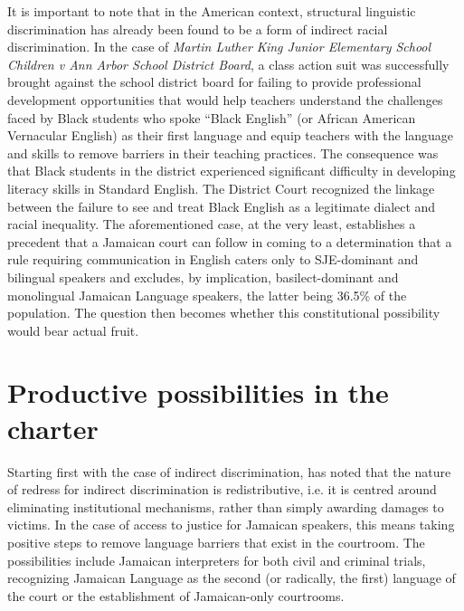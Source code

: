 \documentclass[output=paper,colorlinks,citecolor=brown]{langscibook}
\begin{document}
It is important to note that in the American context, structural linguistic discrimination has already been found to be a form of indirect racial discrimination. In the case of \textit{Martin Luther King Junior Elementary School Children v Ann Arbor School District Board}, a class action suit was successfully brought against the school district board for failing to provide professional development opportunities that would help teachers understand the challenges faced by Black students who spoke “Black English” (or African American Vernacular English) as their first language and equip teachers with the language and skills to remove barriers in their teaching practices. The consequence was that Black students in the district experienced significant difficulty in developing literacy skills in Standard English. The District Court recognized the linkage between the failure to see and treat Black English as a legitimate dialect and racial inequality. The aforementioned case, at the very least, establishes a precedent that a Jamaican court can follow in coming to a determination that a rule requiring communication in English caters only to SJE-dominant and bilingual speakers and excludes, by implication, basilect-dominant and monolingual Jamaican Language speakers, the latter being 36.5\% of the population. The question then becomes whether this constitutional possibility would bear actual fruit. 


\section{Productive possibilities in the charter}
 
Starting first with the case of indirect discrimination, \citet{Mercat-BurnsElaine2016} has noted that the nature of redress for indirect discrimination is redistributive, i.e. it is centred around eliminating institutional mechanisms, rather than simply awarding damages to victims. In the case of access to justice for Jamaican  speakers, this means taking positive steps to remove language barriers that exist in the courtroom. The possibilities include Jamaican interpreters for both civil and criminal trials, recognizing Jamaican Language as the second (or radically, the first) language of the court or the establishment of Jamaican-only courtrooms. 
\end{document}
